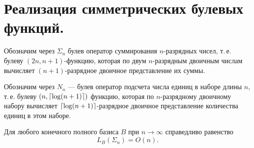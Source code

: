 \section{Реализация симметрических булевых функций.}

\begin{definition}
    Обозначим через $\Sigma_n$ булев оператор суммирования $n$-разрядных чисел, т.\,е. булеву $(2n, n + 1)$-функцию, которая по двум $n$-разрядным двоичным числам вычисляет $(n + 1)$-разрядное двоичное представление их суммы.
\end{definition}

\begin{definition}
     Обозначим через $N_n$ --- булев оператор подсчета числа единиц в наборе длины $n$, т.\,е. булеву $(n, \left\lceil {\log(n + 1)} \right\rceil)$ функцию, которая по $n$-разрядному двоичному набору вычисляет $\left\lceil {\log(n+1)} \right\rceil$-разрядное двоичное представление количества единиц в этом наборе.
\end{definition}

\begin{lemma}
    Для любого конечного полного базиса $B$ при $n \to \infty$ справедливо равенство 
    \[
        L_B(\Sigma_n) = O(n).
    \]
\end{lemma}

